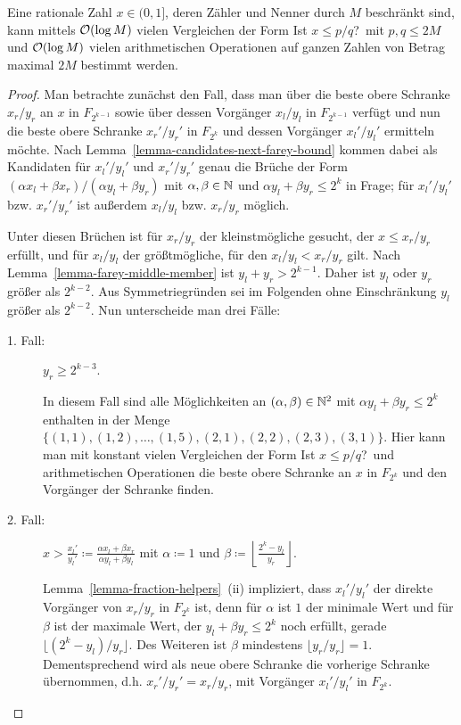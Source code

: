 \begin{theorem}\label{theorem-find-fraction}
	Eine rationale Zahl $x\in(0,1]$, deren Zähler und Nenner durch $M$ beschränkt sind, kann mittels $\mathcal{O}(\log M)$ vielen Vergleichen der Form \glqq Ist $x\leq p/q$?\grqq\ mit $p,q\leq 2M$ und $\mathcal{O}(\log M)$ vielen arithmetischen Operationen auf ganzen Zahlen von Betrag maximal $2M$ bestimmt werden.
\end{theorem}
\begin{proof}	
	Man betrachte zunächst den Fall, dass man über die beste obere Schranke $x_r/y_r$ an $x$ in $F_{2^{k-1}}$ sowie über dessen Vorgänger $x_l/y_l$ in $F_{2^{k-1}}$ verfügt und nun die beste obere Schranke $x_r'/y_r'$ in $F_{2^{k}}$ und dessen Vorgänger $x_l'/y_l'$ ermitteln möchte.
	Nach Lemma~\ref{lemma-candidates-next-farey-bound} kommen dabei als Kandidaten für $x_l'/y_l'$ und $x_r'/y_r'$ genau die Brüche der Form $(\alpha x_l + \beta x_r)/(\alpha y_l + \beta y_r)$ mit $\alpha,\beta\in\mathbb{N}$ und $\alpha y_l + \beta y_r \leq 2^{k}$ in Frage; für $x_l'/y_l'$ bzw. $x_r'/y_r'$ ist außerdem $x_l/y_l$ bzw. $x_r/y_r$ möglich.
	
	Unter diesen Brüchen ist für $x_r/y_r$ der kleinstmögliche gesucht, der $x\leq x_r/y_r$ erfüllt, und für $x_l/y_l$ der größtmögliche, für den $x_l/y_l < x_r/y_r$ gilt.
	Nach Lemma~\ref{lemma-farey-middle-member} ist $y_l + y_r > 2^{k-1}$.
	Daher ist $y_l$ oder $y_r$ größer als $2^{k-2}$.
	Aus Symmetriegründen sei im Folgenden ohne Einschränkung $y_l$ größer als $2^{k-2}$.
	Nun unterscheide man drei Fälle:
	
	\begin{description}
		\item[1. Fall:] $y_r \geq 2^{k-3}$.
		
		In diesem Fall sind alle Möglichkeiten an $(\alpha,\beta)\in\mathbb{N}^2$ mit $\alpha y_l + \beta y_r \leq 2^{k}$ enthalten in der Menge $\{ (1,1), (1,2),\dots,(1,5), (2,1), (2,2),(2,3),(3,1) \}$.
		Hier kann man mit konstant vielen Vergleichen der Form \glqq Ist $x\leq p/q$?\grqq\ und arithmetischen Operationen die beste obere Schranke an $x$ in $F_{2^{k}}$ und den Vorgänger der Schranke finden.
		
		\item[2. Fall:] $x > \frac{x_l'}{y_l'} \coloneq \frac{\alpha x_l + \beta x_r}{\alpha y_l + \beta y_l}$ mit $\alpha \coloneq 1$ und $\beta \coloneq \left\lfloor \frac{2^{k} - y_l}{y_r}\right\rfloor$.
		
		Lemma~\ref{lemma-fraction-helpers}~(ii) impliziert, dass $x_l'/y_l'$ der direkte Vorgänger von $x_r/y_r$ in $F_{2^{k}}$ ist, denn für $\alpha$ ist $1$ der minimale Wert und für $\beta$ ist der maximale Wert, der $y_l + \beta y_r \leq 2^{k}$ noch erfüllt, gerade $\lfloor (2^{k} - y_l)/y_r \rfloor$.
		Des Weiteren ist $\beta$ mindestens $\lfloor y_r/y_r \rfloor = 1$.
		Dementsprechend wird als neue obere Schranke die vorherige Schranke übernommen, d.h. $x_r'/y_r' = x_r/y_r$, mit Vorgänger $x_l'/y_l'$ in $F_{2^{k}}$.
		

\end{description}
\end{proof}
